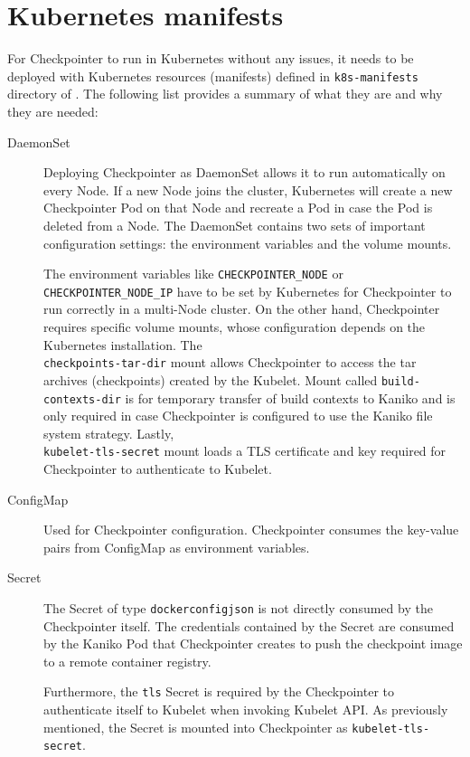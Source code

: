 \documentclass[
  digital,     %
  oneside,     %
  nosansbold,  %
  nocolorbold, %
  lof,         %
  nolot,         %
]{fithesis4}
\begin{document}
\section{Kubernetes manifests}
\label{sec:manifests}
For Checkpointer to run in Kubernetes without any issues, it needs to be deployed with Kubernetes resources (manifests) defined in \texttt{k8s-manifests} directory of . The following list provides a summary of what they are and why they are needed:

\begin{description}
    
    \item[DaemonSet] Deploying Checkpointer as DaemonSet allows it to run automatically on every Node. If a new Node joins the cluster, Kubernetes will create a new Checkpointer Pod on that Node and recreate a Pod in case the Pod is deleted from a Node. The DaemonSet contains two sets of important configuration settings: the environment variables and the volume mounts.

    The environment variables like \texttt{CHECKPOINTER\_NODE} or \\ \texttt{CHECKPOINTER\_NODE\_IP} have to be set by Kubernetes for Checkpointer to run correctly in a multi-Node cluster. On the other hand, Checkpointer requires specific volume mounts, whose configuration depends on the Kubernetes installation. The \\ \texttt{checkpoints-tar-dir} mount allows Checkpointer to access the tar archives (checkpoints) created by the Kubelet. Mount called \texttt{build-contexts-dir} is for temporary transfer of build contexts to Kaniko and is only required in case Checkpointer is configured to use the Kaniko file system strategy. Lastly, \\
    \texttt{kubelet-tls-secret} mount loads a TLS certificate and key required for Checkpointer to authenticate to Kubelet.
    
    \item[ConfigMap] Used for Checkpointer configuration. Checkpointer consumes the key-value pairs from ConfigMap as environment variables.
    
    \item[Secret] The Secret of type \texttt{dockerconfigjson} is not directly consumed by the Checkpointer itself. The credentials contained by the Secret are consumed by the Kaniko Pod that Checkpointer creates to push the checkpoint image to a remote container registry.
    
    Furthermore, the \texttt{tls} Secret is required by the Checkpointer to authenticate itself to Kubelet when invoking Kubelet API. As previously mentioned, the Secret is mounted into Checkpointer as \texttt{kubelet-tls-secret}.
    

\end{description}
\end{document}
